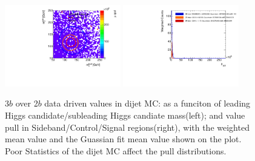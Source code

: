 \begin{figure}[htbp!]
\begin{center}
\includegraphics[angle=270, width=0.45\textwidth]{./figures/boosted/AppendixMuqcdstudy/QCD_ThreeTag_Incl_mH0H1.pdf}
\includegraphics[angle=270, width=0.45\textwidth]{./figures/boosted/AppendixMuqcdstudy/QCD_ThreeTag_Incl_mH0H1_pull.pdf}
\caption{3$b$ over 2$b$ data driven \muqcd values in dijet MC: \muqcd as a funciton of leading Higgs candidate/subleading Higgs candiate mass(left); and \muqcd value pull in Sideband/Control/Signal regions(right), with the weighted mean value and the Guassian fit mean value shown on the plot. Poor Statistics of the dijet MC affect the pull distributions.}
\label{fig:app-muqcd-3b-qcd}
\end{center}
\end{figure}

